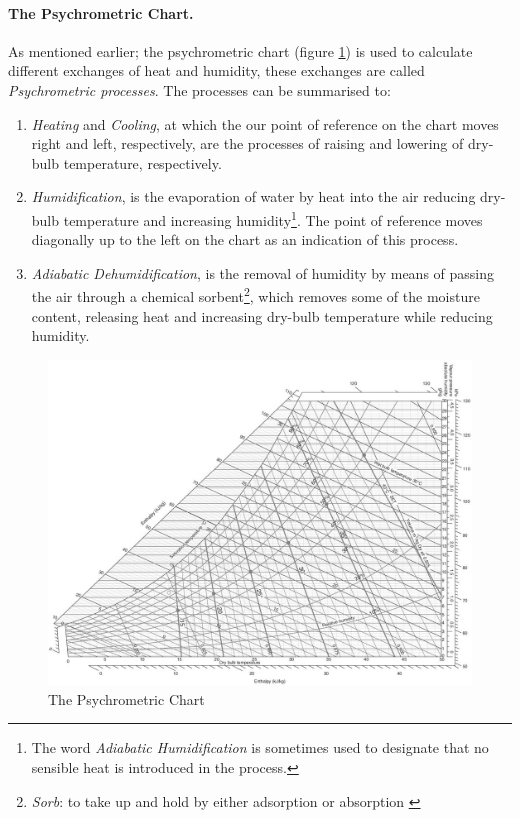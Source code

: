 \paragraph{The Psychrometric Chart.}As mentioned earlier; the psychrometric chart
(figure \ref{PsychroChart}) is used to calculate different exchanges of heat and
humidity, these exchanges are called \emph{Psychrometric processes}. The processes can be summarised to:
\begin{enumerate}
  \item \emph{Heating} and \emph{Cooling}, at which the our point of reference on the chart moves
  right and left, respectively, are the processes of raising and lowering of dry-bulb temperature,
  respectively.
  \item \emph{Humidification}, is the evaporation of water by heat into the air reducing dry-bulb
  temperature and increasing humidity\footnote{The word \emph{Adiabatic Humidification} is sometimes
  used to designate that no sensible heat is introduced in the process.}. The point of reference
  moves diagonally up to the left on the chart as an indication of this process.
  \item \emph{Adiabatic Dehumidification}, is the removal of humidity by means of passing the air
  through a chemical sorbent\footnote{\emph{Sorb}: to take up and hold by either adsorption or
  absorption \cite{merriam03}}, which removes some of the moisture content, releasing heat and
  increasing dry-bulb temperature while reducing humidity.
\end{enumerate}

\begin{figure} %
\centering
\includegraphics[width=\textwidth]{./Images/1-PsychrometricChart}
\caption[The Psychrometiric Chart]{The Psychrometric Chart \cite{szokolay08} \label{PsychroChart}}
\end{figure}

